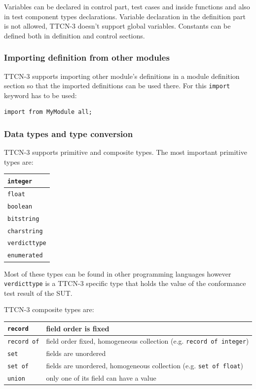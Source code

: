 \documentclass[a4paper]{article}
\begin{document}
Variables can be declared in control part, test cases and inside functions and also in test component types declarations. Variable declaration in the definition part is not allowed, TTCN-3 doesn't support global variables. Constants can be defined both in definition and control sections.

\subsubsection{Importing definition from other modules}
TTCN-3 supports importing other module's definitions in a module definition section so that the imported definitions can be used there. For this \verb.import. keyword has to be used:
{\footnotesize
\begin{lstlisting}
import from MyModule all;
\end{lstlisting}
}

\subsubsection{Data types and type conversion}
TTCN-3 supports primitive and composite types.
The most important primitive types are:
{\footnotesize
\begin{center}
\begin{tabular}{|l|}
\hline
\verb/integer/ \\
\hline 
\verb/float/ \\
\hline
\verb/boolean/ \\
\hline 
\verb/bitstring/ \\
\hline 
\verb/charstring/ \\
\hline 
\verb/verdicttype/ \\
\hline
\verb!enumerated! \\
\hline
\end{tabular}
\end{center}
}

Most of these types can be found in other programming languages however \verb!verdicttype! is a TTCN-3 specific type that holds the value of the conformance test result of the SUT.

TTCN-3 composite types are:

{\footnotesize
\begin{center}
\begin{tabular}{|l|l|} 
\hline
\verb!record! & field order is fixed\\
\hline
\verb!record of! & field order fixed, homogeneous collection (e.g. \verb!record of integer!)\\
\hline
\verb!set! & fields are unordered\\
\hline
\verb!set of! & fields are unordered, homogeneous collection (e.g. \verb!set of float!)\\
\hline
\verb!union! & only one of its field can have a value\\
\hline
\end{tabular}
\end{center}
}
\end{document}
